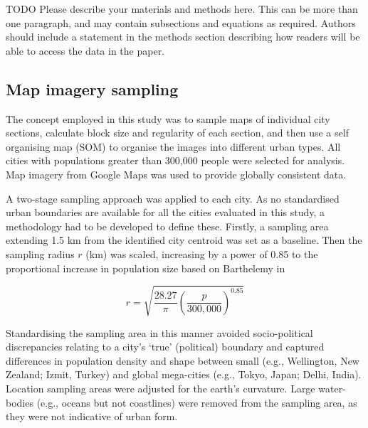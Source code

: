 \documentclass[9pt,twocolumn,twoside,lineno]{pnas-new}
\begin{document}
\matmethods
{
TODO
Please describe your materials and methods here. This can be more than one paragraph, and may contain subsections and equations as required. Authors should include a statement in the methods section describing how readers will be able to access the data in the paper. 





\subsection*{Map imagery sampling}\label{sec:methods2}
The concept employed in this study was to sample maps of individual city sections, calculate block size and regularity of each section, and then use a self organising map (SOM) to organise the images into different urban types. All cities with populations greater than 300,000 people\cite{UN2014} were selected for analysis. Map imagery from Google Maps\cite{GoogleStatic2017} was used to provide globally consistent data. 

A two-stage sampling approach was applied to each city. As no standardised urban boundaries are available for all the cities evaluated in this study, a methodology had to be developed to define these. Firstly, a sampling area extending 1.5 km from the identified city centroid\cite{UN2014} was set as a baseline. Then the sampling radius $r$ (km) was scaled, increasing by a power of 0.85 to the proportional increase in population size based on Barthelemy\cite{Barthelemy2016} in 

\begin{equation}
r = \sqrt{ \frac{28.27}{\pi} \left( \frac{p}{300,000} \right) ^{0.85} }
\end{equation}


Standardising the sampling area in this manner avoided socio-political discrepancies relating to a city's `true' (political) boundary and captured differences in population density and shape between small (e.g., Wellington, New Zealand; Izmit, Turkey) and global mega-cities (e.g., Tokyo, Japan; Delhi, India). Location sampling areas were adjusted for the earth's curvature\cite{Sinnott1984}. Large water-bodies (e.g., oceans but not coastlines) were removed from the sampling area, as they were not indicative of urban form. 

}
\end{document}
